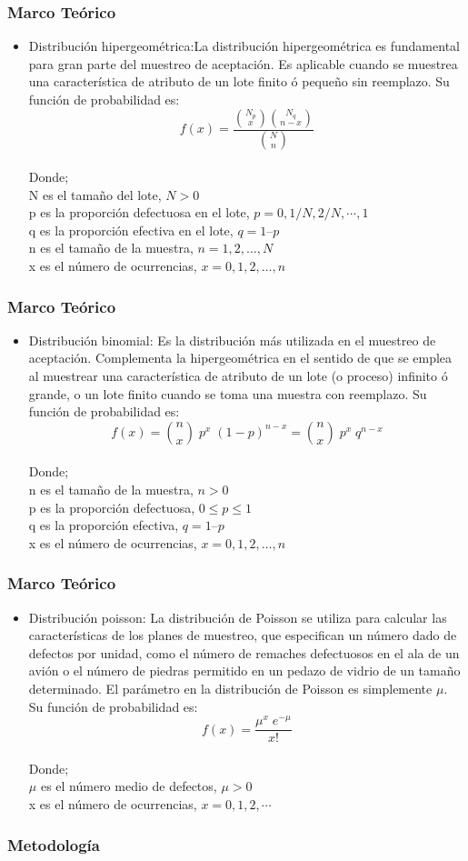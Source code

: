 \documentclass[11pt]{beamer}
\begin{document}
\begin{frame}
\frametitle{Marco Teórico}
\begin{itemize}
\item Distribución hipergeométrica:La distribución hipergeométrica es fundamental para gran parte del muestreo de aceptación. Es aplicable cuando se muestrea una característica de atributo de un lote finito ó pequeño sin reemplazo. Su función de probabilidad es:
$$f(x)=\frac{\binom{N_p}{x}\binom{N_q}{n-x}}{\binom{N}{n}}$$
~\\ Donde; 
~\\ N es el tamaño del lote, $N>0$
~\\ p es la proporción defectuosa en el lote, $p=0, 1/N, 2/N, \cdots , 1$
~\\ q es la proporción efectiva en el lote, $q = 1 – p$
~\\ n es el tamaño de la muestra, $n = 1, 2, …, N$
~\\ x es el número de ocurrencias, $x = 0, 1, 2, …, n$
\end{itemize}
\end{frame}

\begin{frame}
\frametitle{Marco Teórico}
\begin{itemize}
\item Distribución binomial: Es la distribución más utilizada en el muestreo de aceptación. Complementa la hipergeométrica en el sentido de que se emplea al muestrear una característica de atributo de un lote (o proceso) infinito ó grande, o un lote finito cuando se toma una muestra con reemplazo. Su función de probabilidad es:
$$f(x)=\binom{n}{x} \; p^x \; (1-p)^{n-x}=\binom{n}{x} \; p^x \; q^{n-x}$$
~\\ Donde; 
~\\ n es el tamaño de la muestra, $n>0$
~\\ p es la proporción defectuosa, $0\leq p \leq 1$
~\\ q es la proporción efectiva, $q = 1 – p$
~\\ x es el número de ocurrencias, $x = 0, 1, 2, …, n$
\end{itemize}
\end{frame}

\begin{frame}
\frametitle{Marco Teórico}
\begin{itemize}
\item Distribución poisson: La distribución de Poisson se utiliza para calcular las características de los planes de muestreo, que especifican un número dado de defectos por unidad, como el número de remaches defectuosos en el ala de un avión o el número de piedras permitido en un pedazo de vidrio de un tamaño determinado. El parámetro en la distribución de Poisson es simplemente $\mu$. Su función de probabilidad es:
$$f(x)=\frac{{\mu}^x \; e^{-\mu}}{x!}$$
~\\ Donde; 
~\\ $\mu$ es el número medio de defectos, $\mu>0$
~\\ x es el número de ocurrencias, $x=0,1,2,\cdots$
\end{itemize}
\end{frame}

\begin{frame}
\frametitle{Metodología}
\end{frame}
\end{document}
